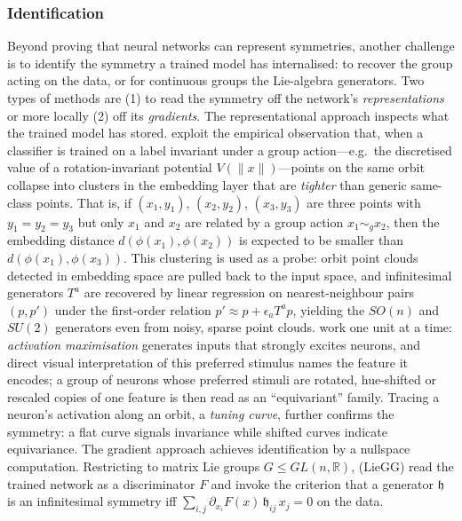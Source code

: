 \documentclass[mathematics,review,submit,moreauthors]{Definitions/mdpi}
\begin{document}
\subsubsection{Identification}\label{par:identification-anchor}
Beyond proving that neural networks can represent symmetries, another challenge is to identify the symmetry a trained model has internalised: to recover the group acting on the data, or for continuous groups the Lie-algebra generators.
Two types of methods are (1) to read the symmetry off the network's \emph{representations} or more locally (2) off its \emph{gradients}.\newline
The representational approach inspects what the trained model has stored.
\citet{krippendorf2020} exploit the empirical observation that, when a classifier is trained on a label invariant under a group action---e.g.\ the discretised value of a rotation-invariant potential $V(\|x\|)$---points on the same orbit collapse into clusters in the embedding layer that are \emph{tighter} than generic same-class points.
That is, if $(x_1, y_1)$, $(x_2, y_2)$, $(x_3, y_3)$ are three points with $y_1 = y_2 = y_3$ but only $x_1$ and $x_2$ are related by a group action $x_1\sim_g x_2$, then the embedding distance $d(\phi(x_1), \phi(x_2))$ is expected to be smaller than $d(\phi(x_1), \phi(x_3))$.
This clustering is used as a probe: orbit point clouds detected in embedding space are pulled back to the input space, and infinitesimal generators $T^a$ are recovered by linear regression on nearest-neighbour pairs $(p,p')$ under the first-order relation $p' \approx p + \epsilon_a T^a p$, yielding the $SO(n)$ and $SU(2)$ generators even from noisy, sparse point clouds.
\citet{olah2020d} work one unit at a time: \emph{activation maximisation} generates inputs that strongly excites neurons, and direct visual interpretation of this preferred stimulus names the feature it encodes; a group of neurons whose preferred stimuli are rotated, hue-shifted or rescaled copies of one feature is then read as an ``equivariant'' family.
Tracing a neuron's activation along an orbit, a \emph{tuning curve}, further confirms the symmetry: a flat curve signals invariance while shifted curves indicate equivariance.\newline
The gradient approach achieves identification by a nullspace computation.
Restricting to matrix Lie groups $G \leq GL(n,\mathbb{R})$, \citet{moskalev2023} (LieGG) read the trained network as a discriminator $F$ and invoke the criterion that a generator $\mathfrak{h}$ is an infinitesimal symmetry iff $\sum_{i,j} \partial_{x_i} F(x)\,\mathfrak{h}_{ij}\, x_j = 0$ on the data.
\end{document}
